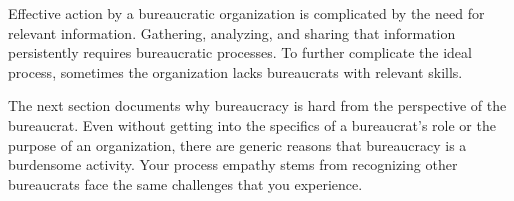 

Effective action by a bureaucratic organization is complicated by the need for relevant information. Gathering, analyzing, and sharing that information persistently requires bureaucratic processes. To further complicate the ideal process, sometimes the organization lacks bureaucrats with relevant skills. 


The next section documents why bureaucracy is hard from the perspective of the bureaucrat. Even without getting into the specifics of a bureaucrat's role or the purpose of an organization, there are generic reasons that bureaucracy is a burdensome activity. Your process empathy stems from recognizing other bureaucrats face the same challenges that you experience.